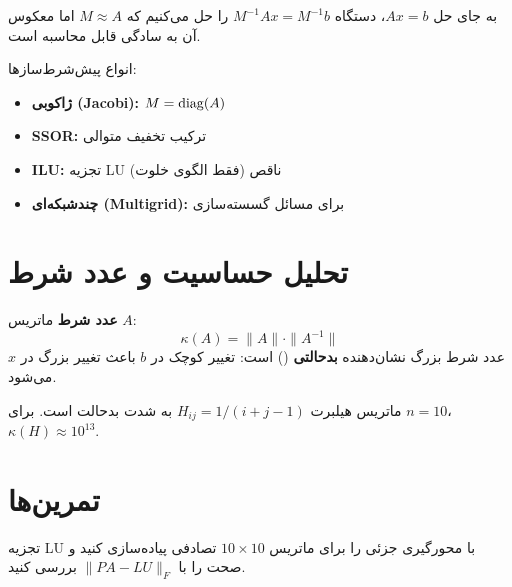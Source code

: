 \documentclass{matinbook}
\begin{document}
    \begin{definition}
        به جای حل $Ax = b$،
        دستگاه $M^{-1}Ax = M^{-1}b$ را حل می‌کنیم
        که $M \approx A$ اما معکوس آن
        به سادگی قابل محاسبه است.
        \label{def:preconditioner}
    \end{definition}
    
    انواع پیش‌شرط‌سازها:
    \begin{itemize}
        \item \textbf{ژاکوبی (Jacobi):}
        $M = \operatorname{diag}(A)$
        \item \textbf{SSOR:}
        ترکیب تخفیف متوالی
        \item \textbf{ILU:}
        تجزیه LU ناقص (فقط الگوی خلوت)
        \item \textbf{چندشبکه‌ای (Multigrid):}
        برای مسائل گسسته‌سازی
    \end{itemize}
    
    \section{تحلیل حساسیت و عدد شرط}
    
    \begin{definition}
        \textbf{عدد شرط} ماتریس $A$:
        \[
        \kappa(A) = \|A\| \cdot \|A^{-1}\|
        \]
        عدد شرط بزرگ نشان‌دهنده
        \textbf{بدحالتی} () است:
        تغییر کوچک در $b$ باعث
        تغییر بزرگ در $x$ می‌شود.
        \label{def:condition-number}
    \end{definition}
    
    \begin{example}
        ماتریس هیلبرت
        $H_{ij} = 1/(i+j-1)$
        به شدت بدحالت است.
        برای $n = 10$،
        $\kappa(H) \approx 10^{13}$.
        \label{ex:hilbert}
    \end{example}
    
    \section{تمرین‌ها}
    
    \begin{exercise}
        تجزیه LU با محورگیری جزئی را
        برای ماتریس $10 \times 10$ تصادفی
        پیاده‌سازی کنید و صحت را با
        $\|PA - LU\|_{F}$ بررسی کنید.
        \label{exc:lu-pivot}
    \end{exercise}
    
\end{document}
